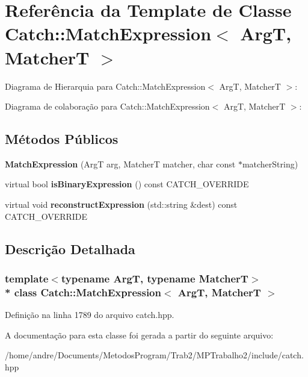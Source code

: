 \hypertarget{classCatch_1_1MatchExpression}{}\section{Referência da Template de Classe Catch\+:\+:Match\+Expression$<$ ArgT, MatcherT $>$}
\label{classCatch_1_1MatchExpression}


Diagrama de Hierarquia para Catch\+:\+:Match\+Expression$<$ ArgT, MatcherT $>$\+:


Diagrama de colaboração para Catch\+:\+:Match\+Expression$<$ ArgT, MatcherT $>$\+:
\subsection*{Métodos Públicos}
\begin{DoxyCompactItemize}
\item 
{\bfseries Match\+Expression} (ArgT arg, MatcherT matcher, char const $\ast$matcher\+String)\hypertarget{classCatch_1_1MatchExpression_a506f25bad7970cb35f9dbe54763a8ca5}{}\label{classCatch_1_1MatchExpression_a506f25bad7970cb35f9dbe54763a8ca5}

\item 
virtual bool {\bfseries is\+Binary\+Expression} () const C\+A\+T\+C\+H\+\_\+\+O\+V\+E\+R\+R\+I\+DE\hypertarget{classCatch_1_1MatchExpression_ac4edf6e9a6e5762a487db1486d0d1f45}{}\label{classCatch_1_1MatchExpression_ac4edf6e9a6e5762a487db1486d0d1f45}

\item 
virtual void {\bfseries reconstruct\+Expression} (std\+::string \&dest) const C\+A\+T\+C\+H\+\_\+\+O\+V\+E\+R\+R\+I\+DE\hypertarget{classCatch_1_1MatchExpression_a4410a93bc5b8241eb2502f400fce7ec4}{}\label{classCatch_1_1MatchExpression_a4410a93bc5b8241eb2502f400fce7ec4}

\end{DoxyCompactItemize}


\subsection{Descrição Detalhada}
\subsubsection*{template$<$typename ArgT, typename MatcherT$>$\\*
class Catch\+::\+Match\+Expression$<$ Arg\+T, Matcher\+T $>$}



Definição na linha 1789 do arquivo catch.\+hpp.



A documentação para esta classe foi gerada a partir do seguinte arquivo\+:\begin{DoxyCompactItemize}
\item 
/home/andre/\+Documents/\+Metodos\+Program/\+Trab2/\+M\+P\+Trabalho2/include/catch.\+hpp\end{DoxyCompactItemize}

